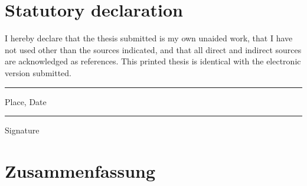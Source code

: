 


\renewcommand{\sectionmark}[1]{\markright{\thesection.\ #1}}
\renewcommand{\headrulewidth}{0.4pt}
\renewcommand*\MakeUppercase[1]{#1}
\fancyhead[L]{\leftmark}
\fancyhead[R]{\thepage}
\fancyfoot[C]{}
\pagestyle{fancy}

\makeatletter
\renewcommand*\tableofcontents{\@starttoc{toc}}
\makeatother

\newpage
\section*{Statutory declaration}
I hereby declare that the thesis submitted is my own unaided work, that I have not used other than the sources indicated, and that all direct and indirect sources are acknowledged as references.
This printed thesis is identical with the electronic version submitted.

\vspace{2.5cm}
\parbox{4cm}{\hrule
\strut \footnotesize Place, Date} \hfill\parbox{4cm}{\hrule
\strut \footnotesize Signature}

\section*{Zusammenfassung}


